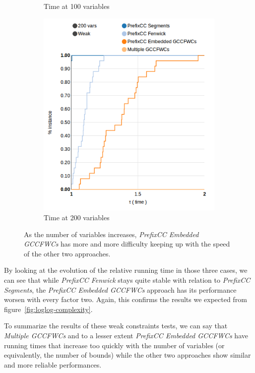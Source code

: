 \documentclass[a4paper,10pt]{article}
\begin{document}
\begin{figure}
\begin{subfigure}[b]{0.3\textwidth}
        \caption{Time at 100 variables}
    \end{subfigure}
    \quad
    \begin{subfigure}[b]{0.3\textwidth}
        \includegraphics[width=\textwidth]{img/weak-200vars-time}
        \caption{Time at 200 variables}
    \end{subfigure}
    
    \caption{As the number of variables increases, \emph{PrefixCC Embedded GCCFWCs} has more and more difficulty keeping up with the speed of the other two approaches.}
    \label{fig:weak-separate}
\end{figure}

By looking at the evolution of the relative running time in those three cases, we can see that while \emph{PrefixCC Fenwick} stays quite stable with relation to \emph{PrefixCC Segments}, the \emph{PrefixCC Embedded GCCFWCs} approach has its performance worsen with every factor two. Again, this confirms the results we expected from figure~\ref{fig:loglog-complexity}.

To summarize the results of these weak constraints tests, we can say that \emph{Multiple GCCFWCs} and to a lesser extent \emph{PrefixCC Embedded GCCFWCs} have running times that increase too quickly with the number of variables (or equivalently, the number of bounds) while the other two approaches show similar and more reliable performances.
\end{document}
